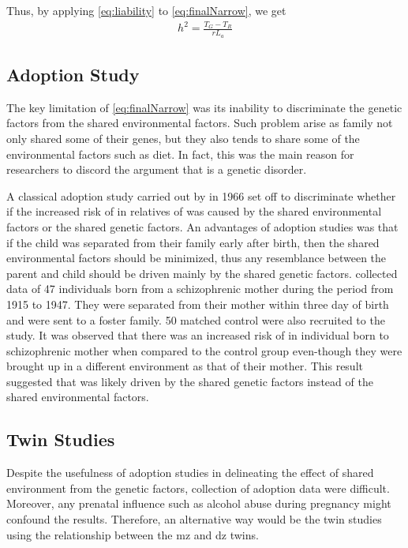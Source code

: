 	Thus, by applying \cref{eq:liability} to \cref{eq:finalNarrow}, we get
	\begin{align}
	h^2 =\frac{T_G-T_R}{rL_a}
	\end{align}
	
	\subsection{Adoption Study}
	The key limitation of \cref{eq:finalNarrow} was its inability to discriminate the genetic factors from the shared environmental factors.
	Such problem arise as family not only shared some of their genes, but they also tends to share some of the environmental factors such as diet. 
	In fact, this was the main reason for researchers to discord the argument that  is a genetic disorder.
	
	A classical adoption study carried out by \citet{HESTON1966} in 1966 set off to discriminate whether if the increased risk of  in relatives of  was caused by the shared environmental factors or the shared genetic factors. 
	An advantages of adoption studies was that if the child was separated from their family early after birth, then the shared environmental factors should be minimized, thus any resemblance between the parent and child should be driven mainly by the shared genetic factors.
	\citet{HESTON1966} collected data of 47 individuals born from a schizophrenic mother during the period from 1915 to 1947. 
	They were separated from their mother within three day of birth and were sent to a foster family. 
	50 matched control were also recruited to the study.
	It was observed that there was an increased risk of  in individual born to schizophrenic mother when compared to the control group even-though they were brought up in a different environment as that of their mother.
	This result suggested that  was likely driven by the shared genetic factors instead of the shared environmental factors.
	
	\subsection{Twin Studies}
	Despite the usefulness of adoption studies in delineating the effect of shared environment from the genetic factors, collection of adoption data were difficult. 
	Moreover, any prenatal influence such as alcohol abuse during pregnancy might confound the results.
	Therefore, an alternative way would be the twin studies using the relationship between the \gls{mz} and \gls{dz} twins.
	
